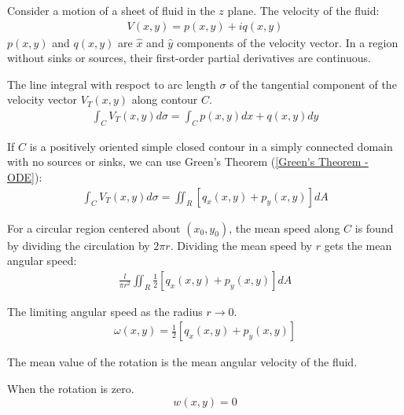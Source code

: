 \documentclass[12pt, english]{book}
\begin{document}
	Consider a motion of a sheet of fluid in the \(z\) plane. The velocity of the fluid:
	\begin{align*}
		V(x,y) = p(x,y) + iq(x,y)
	\end{align*}
	\(p(x,y)\) and \(q(x,y)\) are \(\hat{x}\) and \(\hat{y}\) components of the velocity vector. In a region without sinks or sources, their first-order partial derivatives are continuous. 
	
	\begin{definition}[Circulation]
		\label{Circulation Definition - Complex}
		The line integral with respoct to arc length \(\sigma\) of the tangential component of the velocity vector \(V_T(x,y)\) along contour \(C\).
		\begin{align*}
			\int_{C} V_T(x,y) d\sigma = \int_{C} p(x,y) dx + q(x,y) dy
		\end{align*}
	\end{definition}
	If \(C\) is a positively oriented simple closed contour in a simply connected domain with no sources or sinks, we can use Green's Theorem (\cref{Green's Theorem - ODE}):
	\begin{align*}
		\int_C V_T(x,y) d\sigma = \iint_{R} [q_x(x,y) + p_y(x,y)] dA
	\end{align*}
	
	For a circular region centered about \((x_0, y_0)\), the mean speed along \(C\) is found by dividing the circulation by \(2\pi r\). Dividing the mean speed by \(r\) gets the mean angular speed:
	\begin{align*}
		\frac{l}{\pi r^2} \iint_{R} \frac{1}{2} [q_x(x,y) + p_y(x,y)] dA
	\end{align*}
	
	\begin{definition}
		\label{Rotation of Fluid Definition - Complex}
		The limiting angular speed as the radius \(r \rightarrow 0\).
		\begin{align*}
			\omega (x,y) =  \frac{1}{2} [q_x(x,y) + p_y(x,y)]
		\end{align*}
	\end{definition}
	The mean value of the rotation is the mean angular velocity of the fluid. 

	\begin{definition}
		\label{Irrotational Fluid Definition - Complex}
		\label{Irrotational! Fluid}
		When the rotation is zero.
		\[w(x,y) = 0\]
	\end{definition}
	
\end{document}

